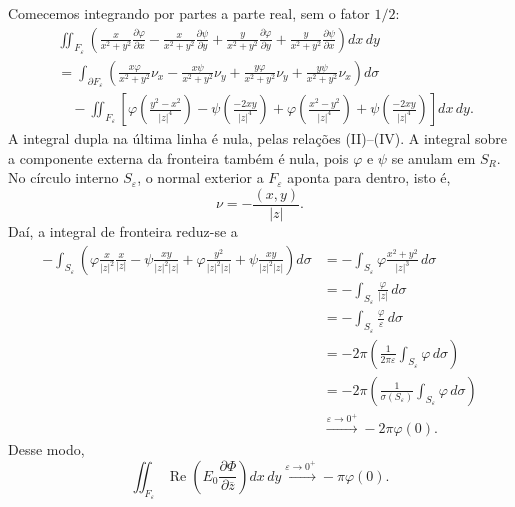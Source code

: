 \documentclass[../distribution_theory_notes.tex]{subfiles}
\begin{document}
Comecemos integrando por partes a parte real, sem o fator \(1/2\):
\begin{align*}
	 & \iint_{F_{\varepsilon}}
	\left(
	\frac{x}{x^{2}+y^{2}}\frac{\partial\varphi}{\partial x}
	-\frac{x}{x^{2}+y^{2}}\frac{\partial\psi}{\partial y}
	+\frac{y}{x^{2}+y^{2}}\frac{\partial\varphi}{\partial y}
	+\frac{y}{x^{2}+y^{2}}\frac{\partial\psi}{\partial x}
	\right)dx\,dy                       \\
	 & =\int_{\partial F_{\varepsilon}}
	\left(
	\frac{x\varphi}{x^{2}+y^{2}}\nu_{x}
	-\frac{x\psi}{x^{2}+y^{2}}\nu_{y}
	+\frac{y\varphi}{x^{2}+y^{2}}\nu_{y}
	+\frac{y\psi}{x^{2}+y^{2}}\nu_{x}
	\right)d\sigma                      \\
	 & \quad-
	\iint_{F_{\varepsilon}}
	\left[
		\varphi\left(\frac{y^{2}-x^{2}}{|z|^{4}}\right)
		-\psi\left(\frac{-2xy}{|z|^{4}}\right)
		+\varphi\left(\frac{x^{2}-y^{2}}{|z|^{4}}\right)
		+\psi\left(\frac{-2xy}{|z|^{4}}\right)
		\right]dx\,dy.
\end{align*}
A integral dupla na última linha é nula, pelas relações (II)--(IV). A integral sobre a componente externa da fronteira também é nula, pois \(\varphi\) e \(\psi\) se anulam em \(S_{R}\). No círculo interno \(S_{\varepsilon}\), o normal exterior a \(F_{\varepsilon}\) aponta para dentro, isto é,
\[
	\nu=-\frac{(x,y)}{|z|}.
\]
Daí, a integral de fronteira reduz-se a
\begin{align*}
	-	\int_{S_{\varepsilon}}
	\left(
	\varphi\frac{x}{|z|^{2}}\frac{x}{|z|}
	-\psi\frac{xy}{|z|^{2}|z|}
	+\varphi\frac{y^{2}}{|z|^{2}|z|}
	+\psi\frac{xy}{|z|^{2}|z|}
	\right)d\sigma
	 & =-\int_{S_{\varepsilon}}
	\varphi\frac{x^{2}+y^{2}}{|z|^{3}}\,d\sigma                        \\
	 & =-\int_{S_{\varepsilon}}\frac{\varphi}{|z|}\,d\sigma            \\
	 & =-\int_{S_{\varepsilon}}\frac{\varphi}{\varepsilon}\,d\sigma    \\
	 & =-2\pi\left(
	\frac{1}{2\pi\varepsilon}\int_{S_{\varepsilon}}\varphi\,d\sigma
	\right)                                                            \\
	 & =-2\pi\left(
	\frac{1}{\sigma(S_{\varepsilon})}\int_{S_{\varepsilon}}\varphi\,d\sigma
	\right)                                                            \\
	 & \stackrel{\varepsilon\to0^{+}}{\longrightarrow}-2\pi\varphi(0).
\end{align*}
Desse modo,
\[
	\iint_{F_{\varepsilon}}
	\operatorname{Re}\left(
	E_{0}\frac{\partial\Phi}{\partial\overline{z}}
	\right)dx\,dy
	\stackrel{\varepsilon\to0^{+}}{\longrightarrow}
	-\pi\varphi(0).
\]
\end{document}
